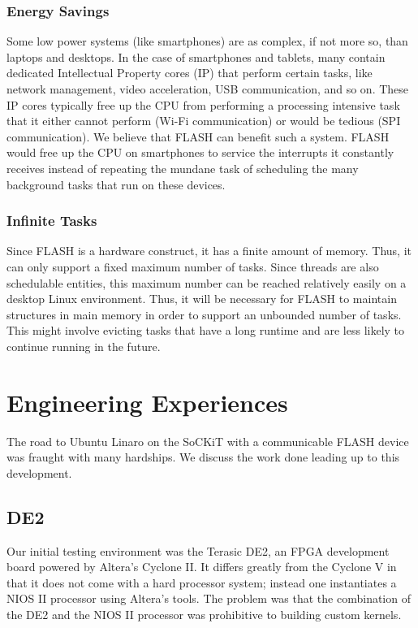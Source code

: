 \documentclass{sig-alternate-10pt}
\begin{document}
\subsubsection{Energy Savings}
Some low power systems (like smartphones) are as complex, if not more so,
than laptops and desktops. In the case of smartphones and tablets, many contain
dedicated Intellectual Property cores (IP) that perform certain tasks, like
network management, video acceleration, USB communication, and so on. These IP
cores typically free up the CPU from performing a processing intensive task
that it either cannot perform (Wi-Fi communication) or would be tedious (SPI
communication). We believe that FLASH can benefit such a system. FLASH would
free up the CPU on smartphones to service the interrupts it constantly
receives instead of repeating the mundane task of scheduling the many
background tasks that run on these devices.

\subsubsection{Infinite Tasks}
Since FLASH is a hardware construct, it has a finite amount of memory. Thus,
it can only support a fixed maximum number of tasks. Since threads are also
schedulable entities, this maximum number can be reached relatively easily
on a desktop Linux environment. Thus, it will be necessary for FLASH to
maintain structures in main memory in order to support an unbounded number
of tasks.  This might involve evicting tasks that have a long runtime and
are less likely to continue running in the future.


\section{Engineering Experiences}
\label{sec:eng_exp}
The road to Ubuntu Linaro on the SoCKiT with a communicable FLASH device was fraught with many hardships. We discuss the work done leading up to this development.
\subsection{DE2}
Our initial testing environment was the Terasic DE2, an FPGA development board powered by Altera's Cyclone II. It differs greatly from the Cyclone V in that it does not come with a hard processor system; instead one instantiates a NIOS II processor using Altera's tools. The problem was that the combination of the DE2 and the NIOS II processor was prohibitive to building custom kernels.
\end{document}
